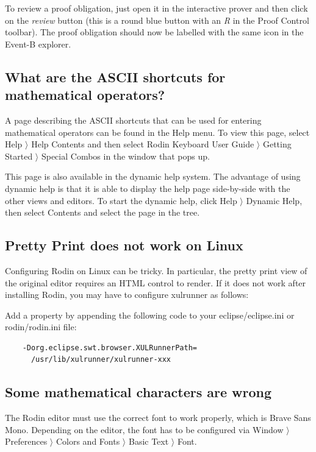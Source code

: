 To review a proof obligation, just open it in the interactive prover and then click on the \emph{review} button (this is a round blue button with an \emph{R} in the \textsf{Proof Control} toolbar). The proof obligation should now be labelled with the same icon in the Event-B explorer. 

\subsection{What are the ASCII shortcuts for mathematical operators?}

A page describing the ASCII shortcuts that can be used for entering mathematical operators can be found in the \textsf{Help} menu. To view this page, select \textsf{Help $\rangle$ Help Contents} and then select \textsf{Rodin Keyboard User Guide $\rangle$ Getting Started $\rangle$ Special Combos} in the window that pops up. 

This page is also available in the dynamic help system. The advantage of using dynamic help is that it is able to display the help page side-by-side with the other views and editors. To start the dynamic help, click \textsf{Help $\rangle$ Dynamic Help}, then select \textsf{Contents} and select the page in the tree. 

\subsection{Pretty Print does not work on Linux}

Configuring Rodin on Linux can be tricky.  In particular, the pretty print view of the original editor requires an HTML control to render.  If it does not work after installing Rodin, you may have to configure xulrunner as follows:

Add a property by appending the following code to your \textsf{eclipse/eclipse.ini} or \textsf{rodin/rodin.ini} file: 

\begin{verbatim} 
	-Dorg.eclipse.swt.browser.XULRunnerPath=
	  /usr/lib/xulrunner/xulrunner-xxx 
\end{verbatim} 

\subsection{Some mathematical characters are wrong}

The Rodin editor must use the correct font to work properly, which is \textsf{Brave Sans Mono}. Depending on the editor, the font has to be configured via Window $\rangle$ Preferences $\rangle$ Colors and Fonts $\rangle$ Basic Text $\rangle$ Font.

